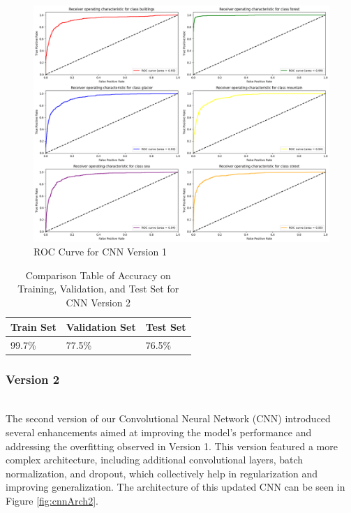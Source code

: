 \documentclass[conference]{IEEEtran}
\begin{document}
\begin{figure}[H]
    \centering
    \includegraphics[width=0.8\linewidth]
    {images/roc_cnn_1.png}
    \caption{ROC Curve for CNN Version 1}
    \label{fig:rocCurveCNN1}
\end{figure}

\begin{table}[H]
    \centering
    \caption{Comparison Table of Accuracy on Training, Validation, and Test Set for CNN Version 2}
    \renewcommand{\arraystretch}{1.5}
    \begin{tabularx}{0.8\linewidth}{|X|X|X|}
    \hline
    \cellcolor[HTML]{EFEFEF}\textbf{Train Set} & \cellcolor[HTML]{EFEFEF}\textbf{Validation Set} & \cellcolor[HTML]{EFEFEF}\textbf{Test Set} \\ \hline
     99.7\%  & 77.5\%  & 76.5\%\\ \hline
    \end{tabularx}
    \label{tab:accMobileNetV2_1}
\end{table}

\subsubsection{Version 2}
\hfill\\

The second version of our Convolutional Neural Network (CNN) introduced several enhancements aimed at improving the model's performance and addressing the overfitting observed in Version 1. This version featured a more complex architecture, including additional convolutional layers, batch normalization, and dropout, which collectively help in regularization and improving generalization.
The architecture of this updated CNN can be seen in Figure \ref{fig:cnnArch2}.
\end{document}
